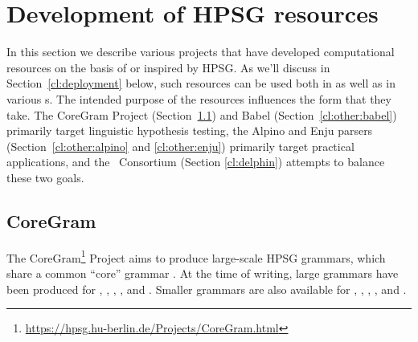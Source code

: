 \documentclass[output=paper
                ,modfonts
                ,nonflat
	        ,collection
	        ,collectionchapter
	        ,collectiontoclongg
 	        ,biblatex
                ,babelshorthands
                ,newtxmath
                ,draftmode
                ,colorlinks, citecolor=brown
]{./langsci/langscibook}
\begin{document}






\section{Development of HPSG resources}
\label{cl:resources}

In this section we describe various projects that have developed computational resources on the basis of or inspired by HPSG.
As we'll discuss in Section~\ref{cl:deployment} below,
such resources can be used both in  as well as in various s.
The intended purpose of the resources influences the form that they take.
The CoreGram Project (Section~\ref{cl:coregram}) and Babel (Section~\ref{cl:other:babel}) primarily target linguistic hypothesis testing,
the Alpino and Enju parsers (Section~\ref{cl:other:alpino} and \ref{cl:other:enju}) primarily target practical applications,
and the \delphin\ Consortium (Section \ref{cl:delphin}) attempts to balance these two goals.


\subsection{CoreGram}
\label{cl:coregram}


The CoreGram\footnote{
	\url{https://hpsg.hu-berlin.de/Projects/CoreGram.html}
} Project
aims to produce large-scale HPSG grammars,
which share a common ``core'' grammar \citep{MuellerCoreGram}.
At the time of writing, large grammars have been produced for
 \citep{MuellerLehrbuch1},
 \citep{MOeDanish-language},
 \citep{MG2010a},
 \citep{MuellerMalteseSketch},
and  \citep{ML2013a}.
Smaller grammars are also available for , , , , and .
\end{document}
